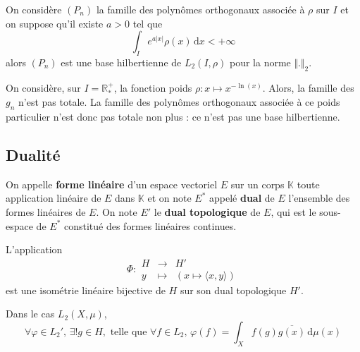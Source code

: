 	\begin{application}
		On considère $(P_n)$ la famille des polynômes orthogonaux associée à $\rho$ sur $I$ et on suppose qu'il existe $a > 0$ tel que
		\[ \int_I e^{a \vert x \vert} \rho(x) \, \mathrm{d}x < +\infty \]
		alors $(P_n)$ est une base hilbertienne de $L_2(I, \rho)$ pour la norme $\Vert . \Vert_2$.
	\end{application}

	\begin{cexample}
		On considère, sur $I = \mathbb{R}^+_*$, la fonction poids $\rho : x \mapsto x^{-\ln(x)}$. Alors, la famille des $g_n$ n'est pas totale. La famille des polynômes orthogonaux associée à ce poids particulier n'est donc pas totale non plus : ce n'est pas une base hilbertienne.
	\end{cexample}

	\subsection{Dualité}


	\begin{definition}
		On appelle \textbf{forme linéaire} d'un espace vectoriel $E$ sur un corps $\mathbb{K}$ toute application linéaire de $E$ dans $\mathbb{K}$ et on note $E^*$ appelé \textbf{dual} de $E$ l'ensemble des formes linéaires de $E$.
		\newpar
		On note $E'$ le \textbf{dual topologique} de $E$, qui est le sous-espace de $E^*$ constitué des formes linéaires continues.
	\end{definition}


	\begin{theorem}
		L'application
		\[
		\Phi :
		\begin{array}{ccc}
			H &\rightarrow& H' \\
			y &\mapsto& (x \mapsto \langle x, y \rangle)
		\end{array}
		\]
		est une isométrie linéaire bijective de $H$ sur son dual topologique $H'$.
	\end{theorem}

	\begin{example}
		Dans le cas $L_2(X, \mu)$,
		\[ \forall \varphi \in L_2', \, \exists! g \in H, \text{ telle que } \forall f \in L_2, \, \varphi(f) = \int_X f(g) \overline{g(x)} \, \mathrm{d}\mu(x) \]
	\end{example}

